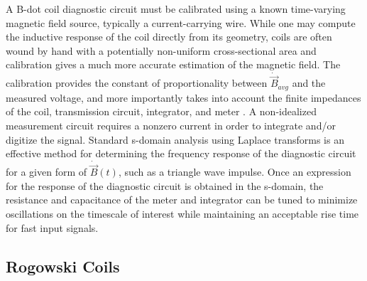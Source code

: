 \documentclass{jpp}
\begin{document}
A B-dot coil diagnostic circuit must be calibrated using a known time-varying magnetic field source, typically a current-carrying wire. While one may compute the inductive response of the coil directly from its geometry, coils are often wound by hand with a potentially non-uniform cross-sectional area and calibration gives a much more accurate estimation of the magnetic field. The calibration provides the constant of proportionality between $\dot {\vec B}_{avg}$ and the measured voltage, and more importantly takes into account the finite impedances of the coil, transmission circuit, integrator, and meter \citep{doi:10.1063/1.3246785}. A non-idealized measurement circuit requires a nonzero current in order to integrate and/or digitize the signal. Standard s-domain analysis using Laplace transforms is an effective method for determining the frequency response of the diagnostic circuit for a given form of $\dot{\vec B}(t)$, such as a triangle wave impulse. Once an expression for the response of the diagnostic circuit is obtained in the s-domain, the resistance and capacitance of the meter and integrator can be tuned to minimize oscillations on the timescale of interest while maintaining an acceptable rise time for fast input signals.

\subsection{Rogowski Coils}
\end{document}

